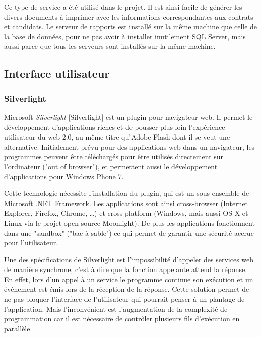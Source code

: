 Ce type de service a été utilisé dans le projet.
Il est ainsi facile de générer les divers documents à imprimer avec les informations correspondantes aux contrats et candidats.
Le serveur de rapports est installé sur la même machine que celle de la base de données, pour ne pas avoir à installer inutilement SQL Server, mais aussi parce que tous les serveurs sont installés sur la même machine.


\subsection{Interface utilisateur}


\subsubsection{Silverlight}
\label{Silverlight}


Microsoft \textit{Silverlight} [Silverlight] est un plugin pour navigateur web.
Il permet le développement d'applications riches et de pousser plus loin l'expérience utilisateur du web 2.0, au même titre qu'Adobe Flash dont il se veut une alternative.
Initialement prévu pour des applications web dans un navigateur, les programmes peuvent être téléchargés pour être utilisés directement sur l'ordinateur ("out of browser"), et permettent aussi le développement d'applications pour Windows Phone 7.

Cette technologie nécessite l'installation du plugin, qui est un sous-ensemble de Microsoft .NET Framework.
Les applications sont ainsi cross-browser (Internet Explorer, Firefox, Chrome, \ldots) et cross-platform (Windows, mais aussi OS-X et Linux via le projet open-source Moonlight).
De plus les applications fonctionnent dans une "sandbox" ("bac à sable") ce qui permet de garantir une sécurité accrue pour l'utilisateur.

Une des spécifications de Silverlight est l'impossibilité d'appeler des services web de manière synchrone, c'est à dire que la fonction appelante attend la réponse.
En effet, lors d'un appel à un service le programme continue son exécution et un événement est émis lors de la réception de la réponse.
Cette solution permet de ne pas bloquer l'interface de l'utilisateur qui pourrait penser à un plantage de l'application.
Mais l'inconvénient est l'augmentation de la complexité de programmation car il est nécessaire de contrôler plusieurs fils d'exécution en parallèle.


